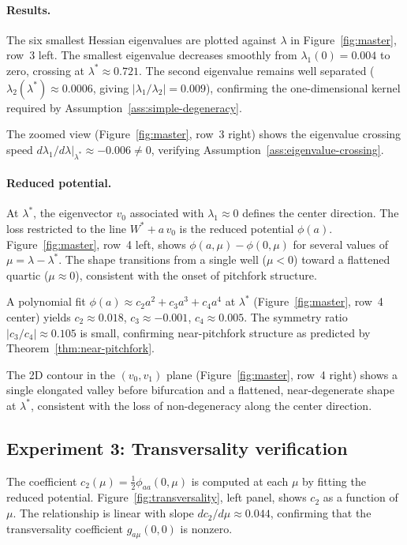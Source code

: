 \documentclass[11pt, reqno]{amsart}
\theoremstyle{plain}
\theoremstyle{definition}
\theoremstyle{remark}
\begin{document}
\paragraph{Results.}
The six smallest Hessian eigenvalues are plotted against $\lambda$ in Figure~\ref{fig:master}, row~3 left. The smallest eigenvalue decreases smoothly from $\lambda_1(0)=0.004$ to zero, crossing at $\lambda^*\approx 0.721$. The second eigenvalue remains well separated ($\lambda_2(\lambda^*)\approx 0.0006$, giving $|\lambda_1/\lambda_2|=0.009$), confirming the one-dimensional kernel required by Assumption~\ref{ass:simple-degeneracy}.

The zoomed view (Figure~\ref{fig:master}, row~3 right) shows the eigenvalue crossing speed $d\lambda_1/d\lambda\big|_{\lambda^*}\approx -0.006\neq 0$, verifying Assumption~\ref{ass:eigenvalue-crossing}.

\paragraph{Reduced potential.}
At $\lambda^*$, the eigenvector $v_0$ associated with $\lambda_1\approx 0$ defines the center direction. The loss restricted to the line $W^*+a\,v_0$ is the reduced potential $\phi(a)$. Figure~\ref{fig:master}, row~4 left, shows $\phi(a,\mu)-\phi(0,\mu)$ for several values of $\mu=\lambda-\lambda^*$. The shape transitions from a single well ($\mu<0$) toward a flattened quartic ($\mu\approx 0$), consistent with the onset of pitchfork structure.

A polynomial fit $\phi(a)\approx c_2 a^2+c_3 a^3+c_4 a^4$ at $\lambda^*$ (Figure~\ref{fig:master}, row~4 center) yields $c_2\approx 0.018$, $c_3\approx -0.001$, $c_4\approx 0.005$. The symmetry ratio $|c_3/c_4|\approx 0.105$ is small, confirming near-pitchfork structure as predicted by Theorem~\ref{thm:near-pitchfork}.

The 2D contour in the $(v_0,v_1)$ plane (Figure~\ref{fig:master}, row~4 right) shows a single elongated valley before bifurcation and a flattened, near-degenerate shape at $\lambda^*$, consistent with the loss of non-degeneracy along the center direction.

\subsection{Experiment 3: Transversality verification}

The coefficient $c_2(\mu)=\tfrac12\phi_{aa}(0,\mu)$ is computed at each $\mu$ by fitting the reduced potential. Figure~\ref{fig:transversality}, left panel, shows $c_2$ as a function of $\mu$. The relationship is linear with slope $dc_2/d\mu\approx 0.044$, confirming that the transversality coefficient $g_{a\mu}(0,0)$ is nonzero.
\end{document}
